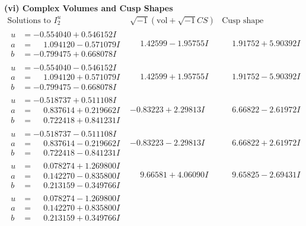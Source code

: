 \documentclass[1p]{elsarticle_modified}
\theoremstyle{definition}
\newcommand{\I}{\sqrt{-1}}
\begin{document}
\newpage\flushleft \textbf{(vi) Complex Volumes and Cusp Shapes}
$$\begin{array}{c|c|c}  
\text{Solutions to }I^u_{2}& \I (\text{vol} + \sqrt{-1}CS) & \text{Cusp shape}\\
 \hline 
\begin{aligned}
u &= -0.554040 + 0.546152 I \\
a &= \phantom{-}1.094120 - 0.571079 I \\
b &= -0.799475 + 0.668078 I\end{aligned}
 & \phantom{-}1.42599 - 1.95755 I & \phantom{-}1.91752 + 5.90392 I \\ \hline\begin{aligned}
u &= -0.554040 - 0.546152 I \\
a &= \phantom{-}1.094120 + 0.571079 I \\
b &= -0.799475 - 0.668078 I\end{aligned}
 & \phantom{-}1.42599 + 1.95755 I & \phantom{-}1.91752 - 5.90392 I \\ \hline\begin{aligned}
u &= -0.518737 + 0.511108 I \\
a &= \phantom{-}0.837614 + 0.219662 I \\
b &= \phantom{-}0.722418 + 0.841231 I\end{aligned}
 & -0.83223 + 2.29813 I & \phantom{-}6.66822 - 2.61972 I \\ \hline\begin{aligned}
u &= -0.518737 - 0.511108 I \\
a &= \phantom{-}0.837614 - 0.219662 I \\
b &= \phantom{-}0.722418 - 0.841231 I\end{aligned}
 & -0.83223 - 2.29813 I & \phantom{-}6.66822 + 2.61972 I \\ \hline\begin{aligned}
u &= \phantom{-}0.078274 + 1.269800 I \\
a &= \phantom{-}0.142270 - 0.835800 I \\
b &= \phantom{-}0.213159 - 0.349766 I\end{aligned}
 & \phantom{-}9.66581 + 4.06090 I & \phantom{-}9.65825 - 2.69431 I \\ \hline\begin{aligned}
u &= \phantom{-}0.078274 - 1.269800 I \\
a &= \phantom{-}0.142270 + 0.835800 I \\
b &= \phantom{-}0.213159 + 0.349766 I\end{aligned}

\end{array}$$
\end{document}
